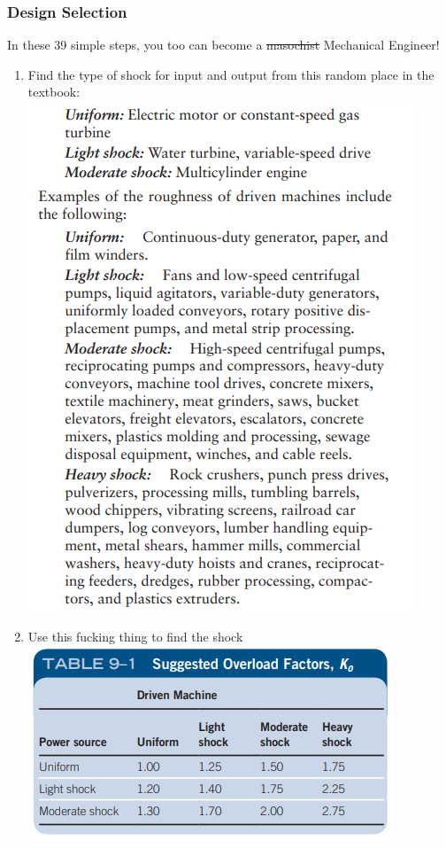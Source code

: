 \documentclass[11pt, fleqn]{article}
\begin{document}
\subsubsection{Design Selection}
In these 39 simple steps, you too can become a \sout{masochist} Mechanical Engineer!
\begin{enumerate}
    \item Find the type of shock for input and output from this random place in the textbook:\\
    \includegraphics[scale=1]{Gears/Shock.png}
    \item Use this fucking thing to find the shock\\
    \includegraphics[scale=1]{Gears/9-1.png}

\end{enumerate}
\end{document}
